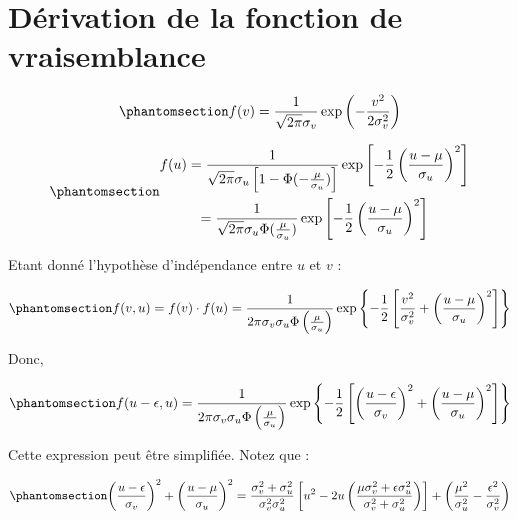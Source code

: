 \documentclass[
  12pt,
]{report}
\begin{document}
\section{Dérivation de la fonction de
vraisemblance}\label{duxe9rivation-de-la-fonction-de-vraisemblance}

\begin{equation}\phantomsection\label{eq-fv}{
f(v) = \frac{1}{\sqrt{2\pi}\sigma_v}\exp{\left(-\frac{v^2}{2\sigma^2_v} \right)}
}\end{equation}

\begin{equation}\phantomsection\label{eq-fu}{
\begin{gathered}
f(u) = \frac{1}{\sqrt{2\pi}\sigma_u\left[1-\Phi(-\frac{\mu}{\sigma_u})\right]}\exp\left[-\frac{1}{2}\left(\frac{u-\mu}{\sigma_u}\right)^2 \right]\\
= \frac{1}{\sqrt{2\pi}\sigma_u\Phi(\frac{\mu}{\sigma_u})}\exp\left[-\frac{1}{2}\left(\frac{u-\mu}{\sigma_u}\right)^2 \right]
\end{gathered}
}\end{equation}

Etant donné l'hypothèse d'indépendance entre \(u\) et \(v\) :

\begin{equation}\phantomsection\label{eq-fv-fu}{
f(v,u) = f(v) \cdot f(u) = \frac{1}{2\pi\sigma_v\sigma_u\Phi\left(\frac{\mu}{\sigma_u}\right)}\exp\left\{-\frac{1}{2}\left[\frac{v^2}{\sigma^2_v} + \left(\frac{u-\mu}{\sigma_u}\right)^2\right] \right\}
}\end{equation}

Donc,

\begin{equation}\phantomsection\label{eq-fepsilon}{
f(u-\epsilon, u) = \frac{1}{2\pi\sigma_v\sigma_u\Phi\left(\frac{\mu}{\sigma_u}\right)}\exp\left\{-\frac{1}{2}\left[\left(\frac{u-\epsilon}{\sigma_v}\right)^2 + \left(\frac{u-\mu}{\sigma_u}\right)^2\right] \right\}
}\end{equation}

Cette expression peut être simplifiée. Notez que :

\begin{equation}\phantomsection\label{eq-fepsilon-2}{
\left(\frac{u-\epsilon}{\sigma_v}\right)^2 + \left(\frac{u-\mu}{\sigma_u}\right)^2 = \frac{\sigma^2_v + \sigma^2_u}{\sigma^2_v\sigma^2_u}\left[u^2 - 2u \left( \frac{\mu\sigma^2_v+\epsilon\sigma^2_u}{\sigma^2_v+\sigma^2_u}\right)\right] + \left(\frac{\mu^2}{\sigma^2_u}-\frac{\epsilon^2}{\sigma^2_v}\right)
}\end{equation}
\end{document}
